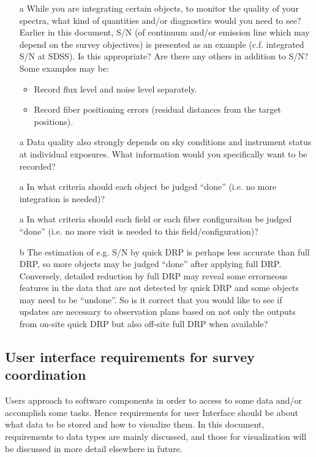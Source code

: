 \documentclass[a4paper,notitlepage]{article}
\begin{document}
\begin{enumerate}
 \item[a] While you are integrating certain objects, to monitor the
      quality of your spectra, what kind of quantities and/or
      diagnostics would you need to see? Earlier in this document,
      S/N (of continuum and/or emission line which may depend on the
      survey objectives) is presented as an example (c.f. integrated
      S/N at SDSS). Is this appropriate? Are there any others in
      addition to S/N? Some examples may be:
      \begin{itemize}
       \item Record flux level and noise level separately.
       \item Record fiber positioning errors (residual distances
         from the target positions).
      \end{itemize}
 \item[a] Data quality also strongly depends on sky conditions and
      instrument status at individual exposures. What information
      would you specifically want to be recorded?
 \item[a] In what criteria should each object be judged ``done''
      (i.e. no more integration is needed)?
 \item[a] In what criteria should each field or each fiber configuraiton
      be judged ``done'' (i.e. no more visit is needed to this
      field/configuration)?
 \item[b] The estimation of e.g. S/N by quick DRP is perhaps less
      accurate than full DRP, so more objects may be judged ``done''
      after applying full DRP. Conversely, detailed reduction by
      full DRP may reveal some errorneous features in the data that
      are not detected by quick DRP and some objects may need to be
      ``undone''. So is it correct that you would like to see if
      updates are necessary to observation plans based on not only
      the outputs from on-site quick DRP but also off-site full DRP
      when available?
\end{enumerate}

\subsection{User interface requirements for survey coordination}

Users approach to software components in order to access to some data
and/or accomplish some tasks. Hence requirements for user Interface
should be about what data to be stored and how to visualize them.
In this document, requirements to data types are mainly discussed, and
those for visualization will be discussed in more detail elsewhere in
future.
\end{document}
